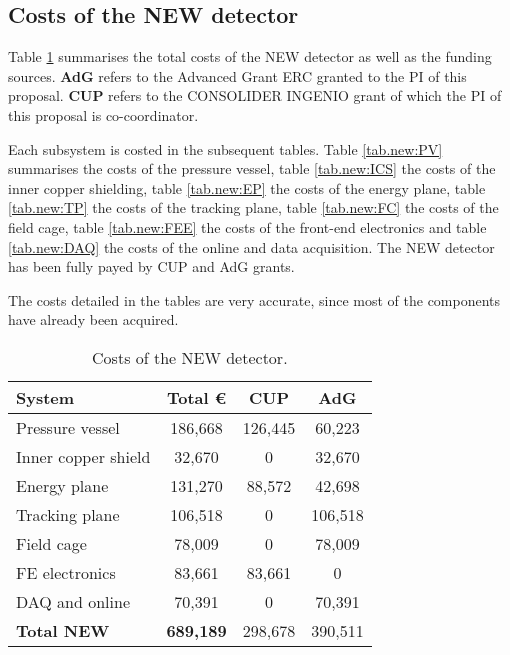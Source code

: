 \subsection{Costs of the NEW detector}
Table \ref{tab.new:DET} summarises the total costs of the NEW detector as well as the funding sources. {\bf AdG} refers to the Advanced Grant ERC granted to the PI of this proposal. {\bf CUP} refers to the CONSOLIDER INGENIO grant of which the PI of this proposal is co-coordinator.

Each subsystem is costed in the subsequent tables. Table \ref{tab.new:PV} summarises the costs of the pressure vessel, 
table \ref{tab.new:ICS} the costs of the inner copper shielding,
table \ref{tab.new:EP} the costs of the energy plane,
table \ref{tab.new:TP} the costs of the tracking plane,
table \ref{tab.new:FC} the costs of the field cage,
table \ref{tab.new:FEE} the costs of the front-end electronics and
table \ref{tab.new:DAQ} the costs of the online and data acquisition. The NEW detector has
been fully payed by CUP and AdG grants.

The costs detailed in the tables are very accurate, since most of the components have already been acquired. 
  
\begin{table}[h!]
\begin{center}
\begin{tabular}{|l|c|c|c|}
\hline
 System & Total \euro & CUP & AdG  \\
 \hline
 Pressure vessel 	& 186,668 &	126,445 &	60,223 \\
Inner copper shield	& 32,670	& 0 &	32,670 \\
Energy plane	& 131,270 &	88,572 &	42,698 \\
Tracking plane	& 106,518 &	0 &	106,518  \\
Field cage	& 78,009 &	0 &	78,009 \\
FE electronics &	83,661 &	83,661 &	0\\
DAQ and online &	70,391 &	0 &	70,391 \\
 \hline
{\bf Total NEW} &	{\bf 689,189 }& 	298,678 & 	390,511 \\	
 \hline\hline
\end{tabular}  
\caption{Costs of the NEW detector.}
\label{tab.new:DET}
\end{center}
\end{table} 

